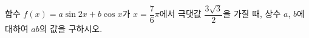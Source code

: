 함수 $f(x)=a\sin 2x+b\cos x$가 $x=\dfrac{7}{6}\pi$에서 극댓값 $\dfrac{3\sqrt{3}}{2}$을 가질 때, 상수 $a$, $b$에 대하여 $ab$의 값을 구하시오.
